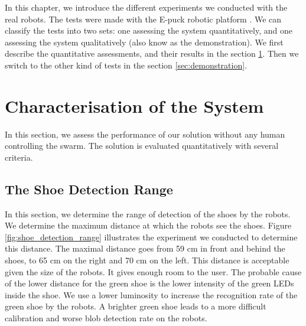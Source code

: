\documentclass[oneside, a4paper, 12pt]{memoir}
\begin{document}
In this chapter, we introduce the different experiments we conducted with the real robots. The tests were made with the E-puck robotic platform \citep{mondada2009puck}. We can classify the tests into two sets: one assessing the system quantitatively, and one assessing the system qualitatively (also know as the demonstration). We first describe the quantitative assessments, and their results in the section \ref{sec:characterisation_system}. Then we switch to the other kind of tests in the section \ref{sec:demonstration}.

	\section{Characterisation of the System}
	\label{sec:characterisation_system}

	
	In this section, we assess the performance of our solution without any human controlling the swarm. The solution is evaluated quantitatively with several criteria.
	
		\subsection{The Shoe Detection Range}
		
			In this section, we determine the range of detection of the shoes by the robots. We determine the maximum distance at which the robots see the shoes. Figure \ref{fig:shoe_detection_range} illustrates the experiment we conducted to determine this distance. The maximal distance goes from 59 cm in front and behind the shoes, to 65 cm on the right and 70 cm on the left. This distance is acceptable given the size of the robots. It gives enough room to the user. The probable cause of the lower distance for the green shoe is the lower intensity of the green LEDs inside the shoe. We use a lower luminosity to increase the recognition rate of the green shoe by the robots. A brighter green shoe leads to a more difficult calibration and worse blob detection rate on the robots.
						
\end{document}
